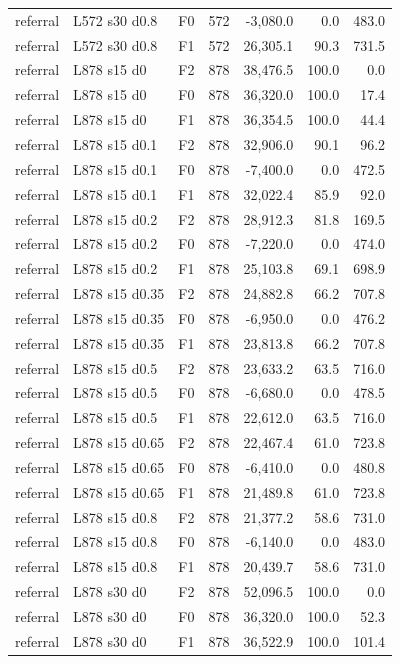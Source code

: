 \begin{longtable}{p{1.8cm}p{3.35cm}lrrrr}
referral & L572 s30 d0.8 & F0 & 572 & -3,080.0 & 0.0 & 483.0\\
referral & L572 s30 d0.8 & F1 & 572 & 26,305.1 & 90.3 & 731.5\\
referral & L878 s15 d0 & F2 & 878 & 38,476.5 & 100.0 & 0.0\\
referral & L878 s15 d0 & F0 & 878 & 36,320.0 & 100.0 & 17.4\\
referral & L878 s15 d0 & F1 & 878 & 36,354.5 & 100.0 & 44.4\\
referral & L878 s15 d0.1 & F2 & 878 & 32,906.0 & 90.1 & 96.2\\
referral & L878 s15 d0.1 & F0 & 878 & -7,400.0 & 0.0 & 472.5\\
referral & L878 s15 d0.1 & F1 & 878 & 32,022.4 & 85.9 & 92.0\\
referral & L878 s15 d0.2 & F2 & 878 & 28,912.3 & 81.8 & 169.5\\
referral & L878 s15 d0.2 & F0 & 878 & -7,220.0 & 0.0 & 474.0\\
referral & L878 s15 d0.2 & F1 & 878 & 25,103.8 & 69.1 & 698.9\\
referral & L878 s15 d0.35 & F2 & 878 & 24,882.8 & 66.2 & 707.8\\
referral & L878 s15 d0.35 & F0 & 878 & -6,950.0 & 0.0 & 476.2\\
referral & L878 s15 d0.35 & F1 & 878 & 23,813.8 & 66.2 & 707.8\\
referral & L878 s15 d0.5 & F2 & 878 & 23,633.2 & 63.5 & 716.0\\
referral & L878 s15 d0.5 & F0 & 878 & -6,680.0 & 0.0 & 478.5\\
referral & L878 s15 d0.5 & F1 & 878 & 22,612.0 & 63.5 & 716.0\\
referral & L878 s15 d0.65 & F2 & 878 & 22,467.4 & 61.0 & 723.8\\
referral & L878 s15 d0.65 & F0 & 878 & -6,410.0 & 0.0 & 480.8\\
referral & L878 s15 d0.65 & F1 & 878 & 21,489.8 & 61.0 & 723.8\\
referral & L878 s15 d0.8 & F2 & 878 & 21,377.2 & 58.6 & 731.0\\
referral & L878 s15 d0.8 & F0 & 878 & -6,140.0 & 0.0 & 483.0\\
referral & L878 s15 d0.8 & F1 & 878 & 20,439.7 & 58.6 & 731.0\\
referral & L878 s30 d0 & F2 & 878 & 52,096.5 & 100.0 & 0.0\\
referral & L878 s30 d0 & F0 & 878 & 36,320.0 & 100.0 & 52.3\\
referral & L878 s30 d0 & F1 & 878 & 36,522.9 & 100.0 & 101.4\\

\end{longtable}
